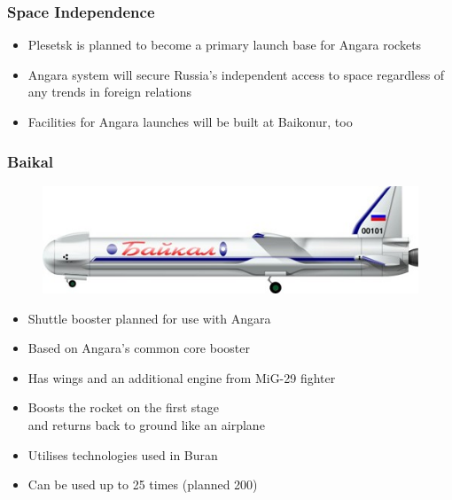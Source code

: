 \documentclass[onlymath]{beamer}
\begin{document}
\begin{frame}
  \frametitle{Space Independence}
  \begin{itemize}
  \item Plesetsk is planned to become a primary launch base for Angara
    rockets
  \item Angara system will secure Russia's independent access to space
    regardless of any trends in foreign relations
  \item Facilities for Angara launches will be built at Baikonur, too
  \end{itemize}
\end{frame}

\begin{frame}
  \frametitle{Baikal}
  \begin{figure}
    \centering
    \includegraphics[scale=0.5]{Baikal.jpg}
  \end{figure}
  \begin{itemize}
  \item Shuttle booster planned for use with Angara
  \item Based on Angara's common core booster
  \item Has wings and an additional engine from MiG-29 fighter
  \item Boosts the rocket on the first stage\\ and returns back to
    ground like an airplane
  \item Utilises technologies used in Buran
  \item Can be used up to 25 times (planned 200)
  \end{itemize}
\end{frame}
\end{document}
